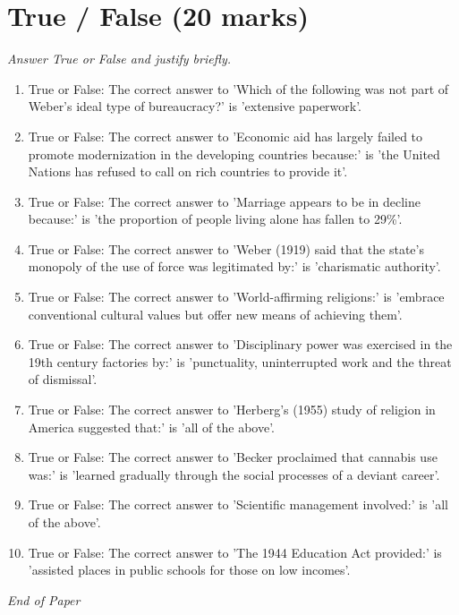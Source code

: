 \documentclass[12pt]{article}
\begin{document}
\section*{True / False (20 marks)}
\textit{Answer True or False and justify briefly.}
\begin{enumerate}[label=\arabic*.]
\item True or False: The correct answer to 'Which of the following was not part of Weber's ideal type of bureaucracy?' is 'extensive paperwork'.
\item True or False: The correct answer to 'Economic aid has largely failed to promote modernization in the developing countries because:' is 'the United Nations has refused to call on rich countries to provide it'.
\item True or False: The correct answer to 'Marriage appears to be in decline because:' is 'the proportion of people living alone has fallen to 29\%'.
\item True or False: The correct answer to 'Weber (1919) said that the state's monopoly of the use of force was legitimated by:' is 'charismatic authority'.
\item True or False: The correct answer to 'World-affirming religions:' is 'embrace conventional cultural values but offer new means of achieving them'.
\item True or False: The correct answer to 'Disciplinary power was exercised in the 19th century factories by:' is 'punctuality, uninterrupted work and the threat of dismissal'.
\item True or False: The correct answer to 'Herberg's (1955) study of religion in America suggested that:' is 'all of the above'.
\item True or False: The correct answer to 'Becker proclaimed that cannabis use was:' is 'learned gradually through the social processes of a deviant career'.
\item True or False: The correct answer to 'Scientific management involved:' is 'all of the above'.
\item True or False: The correct answer to 'The 1944 Education Act provided:' is 'assisted places in public schools for those on low incomes'.
\end{enumerate}

\vfill
\noindent\textit{End of Paper}
\end{document}
